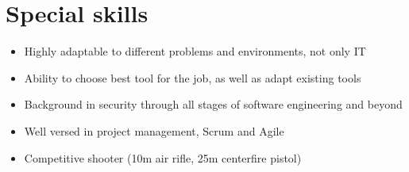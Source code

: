 \documentclass[a4paper]{article}
\begin{document}
\section{Special skills}
\begin{itemize}
    \item Highly adaptable to different problems and environments, not only IT
    \item Ability to choose best tool for the job, as well as adapt existing tools
    \item Background in security through all stages of software engineering and beyond
    \item Well versed in project management, Scrum and Agile
    \item Competitive shooter (10m air rifle, 25m centerfire pistol)
\end{itemize}
\end{document}
